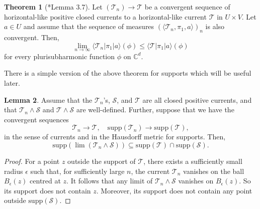 \documentclass[11pt]{amsart}
\theoremstyle{definition}
\newtheorem{theorem}{Theorem}[section]
\newtheorem{lemma}[theorem]{Lemma}
\newtheorem{remark}[theorem]{Remark}
\newcommand{\lto}{\longrightarrow}
\newcommand{\C}{\mathbb{C}}
\newcommand{\sT}{\mathscr{T}}
\newcommand{\sS}{\mathscr{S}}
\newcommand{\supp}[1]{{\mathrm{supp}(#1)}}
\begin{document}







\begin{theorem}[\cite{Berteloot--Dinh}*{Lemma 3.7}]\label{thm:Berteloot-Dinh}
    Let $(\sT_n) \lto \sT$ be a convergent sequence of horizontal-like positive closed currents to a horizontal-like current $\sT$  in $U \times V.$  Let $a\in U$ and assume that the sequence of measures $(\langle \sT_n, \pi_1 , a \rangle)_n$ is also convergent. Then, 
    $$
     \lim_{n \to \infty } \langle \sT_n| \pi_1 | a \rangle (\phi)  \leq  \langle \sT| \pi_1 | a \rangle (\phi) 
    $$
    for every plurisubharmonic function $\phi$ on $\C^d.$
    
\end{theorem}
There is a simple version of the above theorem for supports which will be useful later. 
\begin{lemma}\label{lem:slice-supp}
Assume that the $\sT_n$'s, $\sS$, and $\sT$ are all closed positive currents, and that $\sT_n \wedge \sS$ and $\sT \wedge \sS$ are well-defined. Further, suppose that we have the convergent sequences
$$
\sT_n \lto \sT, \quad  \supp{\sT_n} \lto \supp{\sT},
$$
in the sense of currents and in the Hausdorff metric for supports. Then,
$$
\supp{ \lim (\sT_n \wedge \sS)} \subseteq  \supp{\sT} \cap \supp{\sS}.
$$
\end{lemma}

\begin{proof}
For a point $z$ outside the support of $\sT$, there exists a sufficiently small radius $\epsilon$ such that, for sufficiently large $n$, the current $\sT_n$ vanishes on the ball $B_{\epsilon}(z)$ centred at $z$. It follows that any limit of $\sT_n \wedge \sS$ vanishes on $B_{\epsilon}(z)$. So its support does not contain $z$. Moreover, its support does not contain any point outside $\supp{\sS}$.
\end{proof}
\end{document}
